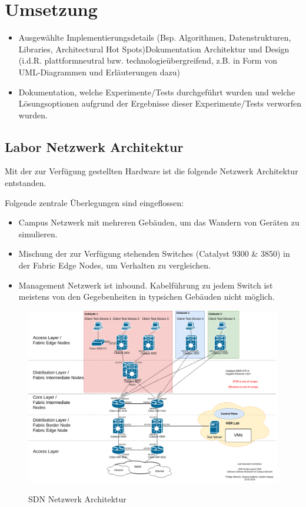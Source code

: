 \section{Umsetzung}

\begin{itemize}
	\item Ausgewählte Implementierungsdetails (Bsp. Algorithmen, Datenstrukturen, Libraries, Architectural Hot Spots)Dokumentation Architektur und Design (i.d.R. plattformneutral bzw. technologieübergreifend, z.B. in Form von UML-Diagrammen und Erläuterungen dazu)
	\item Dokumentation, welche Experimente/Tests durchgeführt wurden und welche Lösungsoptionen aufgrund der Ergebnisse dieser Experimente/Tests verworfen wurden.
\end{itemize}

\subsection{Labor Netzwerk Architektur}
Mit der zur Verfügung gestellten Hardware ist die folgende Netzwerk Architektur entstanden.

Folgende zentrale Überlegungen sind eingeflossen:

\begin{itemize}
	\item Campus Netzwerk mit mehreren Gebäuden, um das Wandern von Geräten zu simulieren.
	\item Mischung der zur Verfügung stehenden Switches (Catalyst 9300 \& 3850) in der Fabric Edge Nodes, um Verhalten zu vergleichen.
	\item Management Netzwerk ist inbound. Kabelführung zu jedem Switch ist meistens von den Gegebenheiten in typsichen Gebäuden nicht möglich.
\end{itemize}


\begin{figure}[H]
	\centering
	\includegraphics[width=1\linewidth]{img/LabNetworkArchitecture.png}\\[1px]
	\caption{SDN Netzwerk Architektur}
	\label{fig:LabNetworkArchitecture}
\end{figure}

